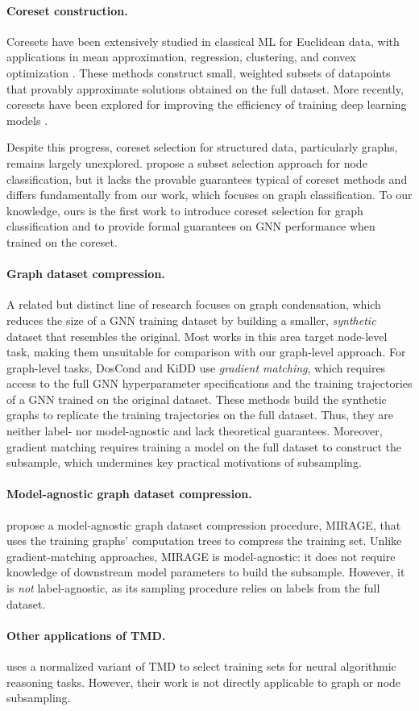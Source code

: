 \paragraph{Coreset construction.}
Coresets have been extensively studied in classical ML for Euclidean data, with applications in mean approximation, regression, clustering, and convex optimization \citep{bachem_practical_2017, mirzasoleiman2020coresets, woodruff_coresets_2024, cohen-addad_improved_2022, tukan_coresets_2020}. These methods construct small, weighted subsets of datapoints that provably approximate solutions obtained on the full dataset. More recently, coresets have been explored for improving the efficiency of training deep learning models \citep{yang_towards_2023, ding_spectral_2024, mirzasoleiman2020coresets}.  

Despite this progress, coreset selection for structured data, particularly graphs, remains largely unexplored. \citet{ding_spectral_2024} propose a subset selection approach for node classification, but it lacks the provable guarantees typical of coreset methods and differs fundamentally from our work, which focuses on graph classification. To our knowledge, ours is the first work to introduce coreset selection for graph classification and to provide formal guarantees on GNN performance when trained on the coreset.


\paragraph{Graph dataset compression.}{ A related but distinct line of research focuses on graph condensation, which reduces the size of a GNN training dataset by building a smaller, \emph{synthetic} dataset that resembles the original. Most works in this area target node-level task, making them unsuitable for comparison with our graph-level approach. For graph-level tasks, DosCond \citep{jin2022condensing} and KiDD \citep{kidd} use \emph{gradient matching}, which requires access to the full GNN hyperparameter specifications and the training trajectories of a GNN trained on the original dataset. These methods build the synthetic graphs to replicate the training trajectories on the full dataset. Thus, they are neither label- nor model-agnostic and lack theoretical guarantees. Moreover, gradient matching requires training a model on the full dataset to construct the subsample, which undermines key practical motivations of subsampling.
}

\paragraph{Model-agnostic graph dataset compression.} \citet{mirage} propose a model-agnostic graph dataset compression procedure, MIRAGE, that uses the training graphs' computation trees to compress the training set. Unlike gradient-matching approaches, MIRAGE is model-agnostic: it does not require knowledge of downstream model parameters to build the subsample. However, it is \emph{not} label-agnostic, as its sampling procedure relies on labels from the full dataset.



\paragraph{Other applications of TMD.} \citet{georgiev23} uses a normalized variant of TMD to select training sets for neural algorithmic reasoning tasks. However, their work is not directly applicable to graph or node subsampling.